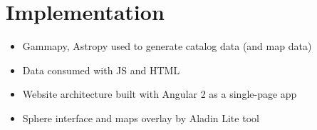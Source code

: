 \section{Implementation}

\begin{itemize}
\item Gammapy, Astropy used to generate catalog data (and map data)
\item Data consumed with JS and HTML
\item Website architecture built with Angular 2 as a single-page app
\item Sphere interface and maps overlay by Aladin Lite tool
\end{itemize}
